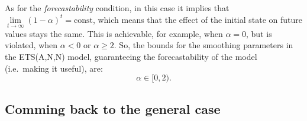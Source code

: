 \documentclass[
]{book}
\theoremstyle{definition}
\theoremstyle{definition}
\theoremstyle{definition}
\theoremstyle{definition}
\theoremstyle{remark}
\begin{document}
As for the \emph{forecastability} condition, in this case it implies that \(\lim\limits_{t\rightarrow\infty}(1 -{\alpha})^t = \text{const}\), which means that the effect of the initial state on future values stays the same. This is achievable, for example, when \(\alpha=0\), but is violated, when \(\alpha<0\) or \(\alpha\geq 2\). So, the bounds for the smoothing parameters in the ETS(A,N,N) model, guaranteeing the forecastability of the model (i.e.~making it useful), are:
\begin{equation}
  \alpha \in [0, 2) .
  \label{eq:ETSADAMStateSpaceANNBounds}
\end{equation}

\hypertarget{comming-back-to-the-general-case}{%
\subsection{Comming back to the general case}\label{comming-back-to-the-general-case}}
\end{document}
